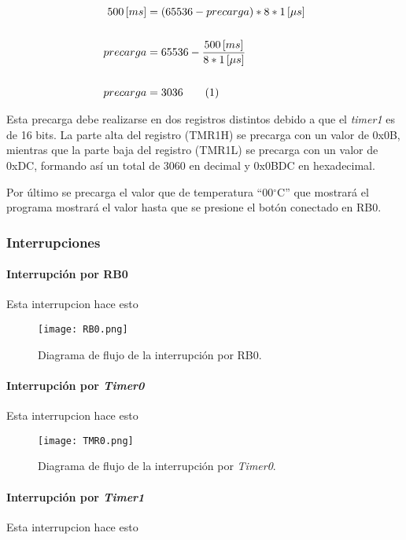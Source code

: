 \documentclass[12pt,a4paper]{article}
\newcommand\numberthis{\addtocounter{equation}{1}\tag{\theequation}}
\begin{document}
	\begin{align*}
	500\,[ms] &= (65536 - precarga) * 8 * 1\,[\mu s]\\
	\\ precarga &= 65536 - \frac{500\,[ms]}{8 * 1\,[\mu s]}\\
	\\ precarga &= 3036 \numberthis
	\end{align*}
	
	Esta precarga debe realizarse en dos registros distintos debido a que el \emph{timer1} es de 16 bits. La parte alta del registro (TMR1H) se precarga con un valor de 0x0B, mientras que la parte baja del registro (TMR1L) se precarga con un valor de 0xDC, formando así un total de 3060 en decimal y 0x0BDC en hexadecimal.	
	
	Por último se precarga el valor que de temperatura ``00$^{\circ}$C'' que mostrará el programa mostrará el valor hasta que se presione el botón conectado en RB0.
	
	\newpage
	\subsubsection{Interrupciones}

	\paragraph{Interrupción por RB0} Esta interrupcion hace esto
	
	\begin{figure}[H]
	\texttt{[image: RB0.png]}
	\centering
	\caption{Diagrama de flujo de la interrupción por RB0.}
	\label{RB0}
	\end{figure}
	
	\paragraph{Interrupción por \emph{Timer0}} Esta interrupcion hace esto
	
	\begin{figure}[H]
	\texttt{[image: TMR0.png]}
	\centering
	\caption{Diagrama de flujo de la interrupción por \emph{Timer0}.}
	\label{TM0}
	\end{figure}
	
	
	\paragraph{Interrupción por \emph{Timer1}} Esta interrupcion hace esto
	
\end{document}
